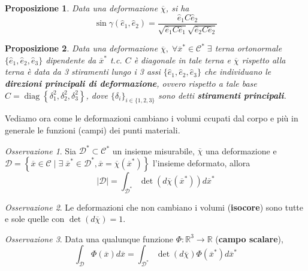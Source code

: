 \documentclass{book}
\theoremstyle{plain}
\theoremstyle{plain}
\theoremstyle{plain}
\theoremstyle{plain}
\theoremstyle{plain}
\newtheorem{prop}{Proposizione}[chapter]
\theoremstyle{definition}
\theoremstyle{remark}
\newtheorem*{oss}{Osservazione}
\theoremstyle{definition}
\begin{document}
\begin{prop}
    Data una deformazione $\overline{\chi}$, si ha
    \begin{displaymath}
        \sin\gamma(\hat{e}_1,\hat{e}_2)= \frac{\hat{e}_1 C \hat{e}_2}{\sqrt{\hat{e}_1 C \hat{e}_1} \sqrt{\hat{e}_2 C \hat{e}_2}}
    \end{displaymath}
\end{prop}

\begin{prop}
    Data una deformazione $\overline{\chi}, \;\forall\overline{x}^* \in \mathcal{C}^* \; \exists$ terna ortonormale $\{\hat{e}_1, \hat{e}_2, \hat{e}_3\}$ dipendente da $\overline{x}^*$ t.c. $C$ è diagonale in tale terna e $\overline{\chi}$ rispetto alla terna è data da 3 stiramenti lungo i 3 assi $\{\hat{e}_1, \hat{e}_2, \hat{e}_3\}$ che individuano le \textbf{direzioni principali di deformazione}, ovvero rispetto a tale base $C=\operatorname{diag}\left\{{\delta}^2_1, {\delta}^2_2, {\delta}^2_3\right\}$, dove $\{\delta_i\}_{i\in\{1,2,3\}}$ sono detti \textbf{stiramenti principali}. 
\end{prop}

\noindent Vediamo ora come le deformazioni cambiano i volumi ccupati dal corpo e più in generale le funzioni (campi) dei punti materiali.

\begin{oss}
    Sia $\mathcal{D}^*\subset\mathcal{C}^* $ un insieme misurabile,  $\overline{\chi}$ una deformazione e $\mathcal{D}=\left\{ \overline{x}\in\mathcal{C} \; | \; \exists\; \overline{x}^* \in \mathcal{D}^*, \overline{x}=\overline{\chi}(\overline{x}^*)\right\}$ l'insieme deformato, allora
    \begin{displaymath}
        \left|\mathcal{D}\right|=\int_{\mathcal{D}^*}\det\left(d\overline{\chi}(\overline{x}^*)\right)d\overline{x}^*
    \end{displaymath}
\end{oss}

\begin{oss}
    Le deformazioni che non cambiano i volumi (\textbf{isocore}) sono tutte e sole quelle con $\det(d\overline{\chi})=1$.
\end{oss}

\begin{oss}
\everymath{\displaystyle}
    Data una qualunque funzione $\Phi:\mathbb{R}^3\to\mathbb{R}$ (\textbf{campo scalare}),
    \begin{displaymath}
        \int_{\mathcal{D}}\Phi(\overline{x})d\overline{x} = \int_{\mathcal{D}^*} \det(d\overline{\chi})  \Phi(\overline{x}^*)d\overline{x}^*
    \end{displaymath}
\end{oss}
\end{document}
